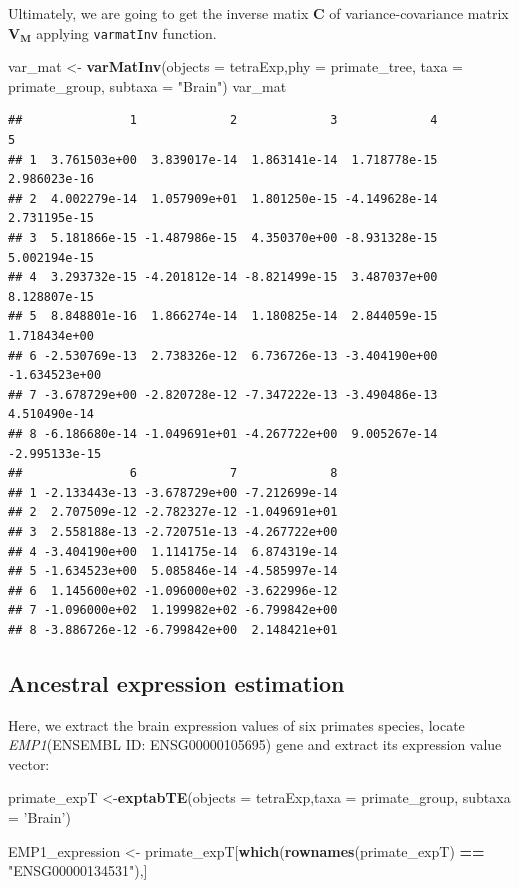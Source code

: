 \documentclass[]{book}
\newenvironment{Shaded}{\begin{snugshade}}{\end{snugshade}}
\newcommand{\DataTypeTok}[1]{\textcolor[rgb]{0.13,0.29,0.53}{#1}}
\newcommand{\KeywordTok}[1]{\textcolor[rgb]{0.13,0.29,0.53}{\textbf{#1}}}
\newcommand{\NormalTok}[1]{#1}
\newcommand{\OperatorTok}[1]{\textcolor[rgb]{0.81,0.36,0.00}{\textbf{#1}}}
\newcommand{\StringTok}[1]{\textcolor[rgb]{0.31,0.60,0.02}{#1}}
\begin{document}
Ultimately, we are going to get the inverse matix \(\boldsymbol{C}\) of variance-covariance matrix \(\boldsymbol{V_M}\) applying \texttt{varmatInv} function.

\begin{Shaded}
\begin{Highlighting}[]
\NormalTok{var_mat <-}\StringTok{ }\KeywordTok{varMatInv}\NormalTok{(}\DataTypeTok{objects =}\NormalTok{ tetraExp,}\DataTypeTok{phy =}\NormalTok{ primate_tree,}
                     \DataTypeTok{taxa =}\NormalTok{ primate_group, }\DataTypeTok{subtaxa =} \StringTok{"Brain"}\NormalTok{)}
\NormalTok{var_mat}
\end{Highlighting}
\end{Shaded}

\begin{verbatim}
##               1             2             3             4             5
## 1  3.761503e+00  3.839017e-14  1.863141e-14  1.718778e-15  2.986023e-16
## 2  4.002279e-14  1.057909e+01  1.801250e-15 -4.149628e-14  2.731195e-15
## 3  5.181866e-15 -1.487986e-15  4.350370e+00 -8.931328e-15  5.002194e-15
## 4  3.293732e-15 -4.201812e-14 -8.821499e-15  3.487037e+00  8.128807e-15
## 5  8.848801e-16  1.866274e-14  1.180825e-14  2.844059e-15  1.718434e+00
## 6 -2.530769e-13  2.738326e-12  6.736726e-13 -3.404190e+00 -1.634523e+00
## 7 -3.678729e+00 -2.820728e-12 -7.347222e-13 -3.490486e-13  4.510490e-14
## 8 -6.186680e-14 -1.049691e+01 -4.267722e+00  9.005267e-14 -2.995133e-15
##               6             7             8
## 1 -2.133443e-13 -3.678729e+00 -7.212699e-14
## 2  2.707509e-12 -2.782327e-12 -1.049691e+01
## 3  2.558188e-13 -2.720751e-13 -4.267722e+00
## 4 -3.404190e+00  1.114175e-14  6.874319e-14
## 5 -1.634523e+00  5.085846e-14 -4.585997e-14
## 6  1.145600e+02 -1.096000e+02 -3.622996e-12
## 7 -1.096000e+02  1.199982e+02 -6.799842e+00
## 8 -3.886726e-12 -6.799842e+00  2.148421e+01
\end{verbatim}

\hypertarget{ancestral-expression-estimation}{%
\subsection{Ancestral expression estimation}\label{ancestral-expression-estimation}}

Here, we extract the brain expression values of six primates species, locate \emph{EMP1}(ENSEMBL ID: ENSG00000105695) gene and extract its expression value vector:

\begin{Shaded}
\begin{Highlighting}[]
\NormalTok{primate_expT <-}\KeywordTok{exptabTE}\NormalTok{(}\DataTypeTok{objects =}\NormalTok{ tetraExp,}\DataTypeTok{taxa =}\NormalTok{ primate_group,}
                            \DataTypeTok{subtaxa =} \StringTok{'Brain'}\NormalTok{)}

\NormalTok{EMP1_expression <-}\StringTok{ }\NormalTok{primate_expT[}\KeywordTok{which}\NormalTok{(}\KeywordTok{rownames}\NormalTok{(primate_expT) }\OperatorTok{==}\StringTok{ "ENSG00000134531"}\NormalTok{),]}
\end{Highlighting}
\end{Shaded}
\end{document}
